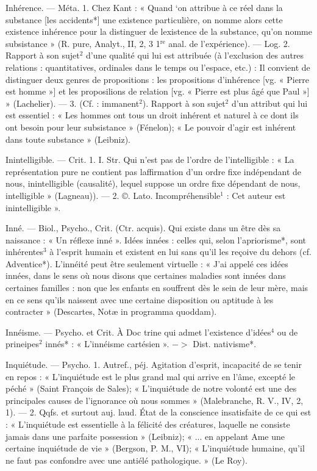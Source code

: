 Inhérence. — Méta. 1. Chez Kant :
« Quand ‘on attribue à ce réel dans
la substance [les accidents*] une
existence particulière, on nomme
alors cette existence inhérence pour
la distinguer de lexistence de la
substance, qu’on nomme subsistance » (R. pure, Analyt., II, 2, 3
1$^\text{re}$ anal. de l'expérience). — Log.
2. Rapport à son sujet$^2$ d’une qualité
qui lui est attribuée (à l’exclusion
des autres relations : quantitatives,
ordinales dans le temps ou l’espace,
etc.) : Il convient de distinguer
deux genres de propositions : les
propositions d’inhérence [vg. « Pierre
est homme »] et les proposilions de
relation [vg. « Pierre est plus âgé
que Paul »] » (Lachelier). — 3. (Cf. :
immanent$^2$). Rapport à son sujet$^2$
d'un attribut qui lui est essentiel :
« Les hommes ont tous un droit
inhérent et naturel à ce dont ils ont
besoin pour leur subsistance »
(Fénelon); « Le pouvoir d'agir est
inhérent dans toute substance »
(Leibniz).

Inintelligible. — Crit. 1. I. Str. Qui
n’est pas de l’ordre de l’intelligible :
« La représentation pure ne contient
pas laffirmation d’un ordre fixe
indépendant de nous, inintelligible
(causalité), lequel suppose un ordre
fixe dépendant de nous, intelligible » (Lagneau)). — 2. ©. Lato.
Incompréhensible$^1$ : Cet auteur
est inintelligible ».

Inné. — Biol., Psycho., Crit. (Ctr.
acquis). Qui existe dans un être dès
sa naissance : « Un réflexe inné ».
Idées innées : celles qui, selon l’apriorisme*, sont inhérentes$^3$ à l'esprit
humain et existent en lui sans qu'il
les reçoive du dehors (cf. Adventice*). L’innéité peut être seulement virtuelle : « J'ai appelé ces
idées innées, dans le sens où nous
disons que certaines maladies sont
innées dans certaines familles : non
que les enfants en souffrent dès le
sein de leur mère, mais en ce sens
qu'ils naissent avec une certaine
disposition ou aptitude à les contracter » (Descartes, Notæ in programma quoddam).

Innéisme. — Psycho. et Crit. À Doc
trine qui admet l'existence d’idées$^4$
ou de prineipes$^2$ innés* : « L’innéisme cartésien ». $->$ Dist. nativisme*.

Inquiétude. — Psycho. 1. Autref., péj.
Agitation d'esprit, incapacité de se
tenir en repos : « L’inquiétude est le
plus grand mal qui arrive en l'âme,
excepté le péché » (Saint François
de Sales); « L’inquiétude de notre
volonté est une des principales
causes de l'ignorance où nous
sommes » (Malebranche, R. V., IV,
2, 1). — 2. Qqfs. et surtout auj.
laud. État de la conscience insatisfaite de ce qui est : « L’inquiétude
est essentielle à la félicité des créatures, laquelle ne consiste jamais
dans une parfaite possession »
(Leibniz); « ... en appelant Ame une
certaine inquiétude de vie » (Bergson,
P. M., VI); « L'inquiétude humaine,
qu'il ne faut pas confondre avec
une antiélé pathologique. » (Le
Roy).

